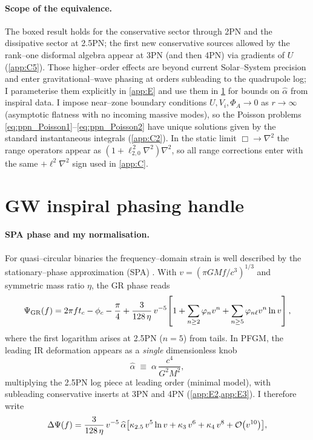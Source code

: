 \documentclass{iopjournal}
\begin{document}
\paragraph{Scope of the equivalence.}
The boxed result holds for the conservative sector through 2PN and the dissipative sector at 2.5PN; the first new conservative sources allowed by the rank–one disformal algebra appear at 3PN (and then 4PN) via gradients of $U$ (\cref{app:C5}). Those higher–order effects are beyond current Solar–System precision and enter gravitational–wave phasing at orders subleading to the quadrupole log; I parameterise them explicitly in \cref{app:E} and use them in \cref{sec:phasing} for bounds on $\widehat\alpha$ from inspiral data.
I impose near–zone boundary conditions $U,V_i,\Phi_A\to 0$ as $r\to\infty$ (asymptotic flatness with no incoming massive modes), so the Poisson problems \eqref{eq:ppn_Poisson1}–\eqref{eq:ppn_Poisson2} have unique solutions given by the standard instantaneous integrals (\cref{app:C2}).
In the static limit $\Box\to\nabla^{2}$ the range operators appear as $(1+\ell_{2,0}^{\,2}\nabla^{2})\nabla^{2}$, so all range corrections enter with the same $+\ell^{2}\nabla^{2}$ sign used in \cref{app:C}.

\section{GW inspiral phasing handle}\label{sec:phasing}
\paragraph{SPA phase and my normalisation.}
For quasi–circular binaries the frequency–domain strain is well described by the stationary–phase approximation (SPA) \cite{CutlerFlanagan1994,SathyaprakashSchutz2009,Blanchet2014LRR}. With $v=(\pi GM f/c^{3})^{1/3}$ and symmetric mass ratio $\eta$, the GR phase reads
\begin{equation}
\Psi_{\rm GR}(f)=2\pi f t_c-\phi_c-\frac{\pi}{4}
+\frac{3}{128\,\eta}\,v^{-5}\!\left[1+\sum_{n\ge2}\varphi_n v^{n}+\sum_{n\ge5}\varphi_{n\ell} v^{n}\ln v\right],
\label{eq:phasing_GR}
\end{equation}
where the first logarithm arises at 2.5PN ($n=5$) from tails. In PFGM, the leading IR deformation appears as a \emph{single} dimensionless knob
\begin{equation}
\widehat\alpha\;\equiv\;\alpha\,\frac{c^{4}}{G^{2}M^{2}},
\label{eq:phasing_alpha_hat}
\end{equation}
multiplying the 2.5PN log piece at leading order (minimal model), with subleading conservative inserts at 3PN and 4PN (\cref{app:E2,app:E3}). I therefore write
\begin{equation}
\Delta\Psi(f)
= \frac{3}{128\,\eta}\,v^{-5}\,\widehat{\alpha}
\bigl[\kappa_{2.5}\,v^{5}\ln v+\kappa_{3}\,v^{6}+\kappa_{4}\,v^{8}+\order{v^{10}}\bigr],
\label{eq:phasing_template}
\end{equation}
\end{document}
